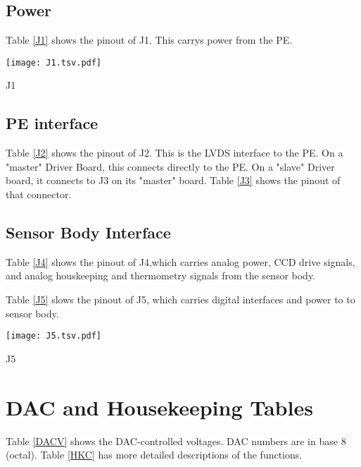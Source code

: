 \subsection{Power}

Table \ref{J1} shows the pinout of J1. This carrys power from the PE.

\begin{table}[h]
\centering
\texttt{[image: J1.tsv.pdf]}
\caption{J1}
\label{J1}
\end{table}

\subsection{PE interface}

Table \ref{J2} shows the pinout of J2. This is the LVDS interface to the PE. On a "master" Driver Board, this connects directly to the PE. On a "slave" Driver board, it connects to J3 on its "master" board. Table \ref{J3} shows the pinout of that connector.


\subsection{Sensor Body Interface}

Table \ref{J4} shows the pinout of J4,which carries analog power, CCD drive signals, and analog houskeeping and thermometry signals from the sensor body.


Table \ref{J5} slows the pinout of J5, which carries digital interfaces and power to to sensor body.

\begin{table}[h]
\centering
\texttt{[image: J5.tsv.pdf]}
\caption{J5}
\label{J5}
\end{table}

\section{DAC and Housekeeping Tables}

Table \ref{DACV} shows the DAC-controlled voltages. DAC numbers are in base 8 (octal). Table \ref{HKC} has more detailed descriptions of the functions.

